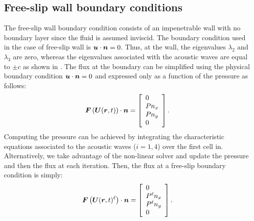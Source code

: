 \subsection{Free-slip wall boundary conditions} \label{sec:wall-bc}
The free-slip wall boundary condition consists of an impenetrable wall with no boundary layer since the fluid is assumed inviscid. The boundary condition used in the case of free-slip wall is $\boldsymbol u \cdot \boldsymbol n = 0$. Thus, at the wall, the eigenvalues $\lambda_2$ and $\lambda_3$ are zero, whereas the eigenvalues associated with the acoustic waves are equal to $\pm c$ as shown in . The flux at the boundary can be simplified using the physical boundary condition $\boldsymbol u \cdot \boldsymbol n = 0$ and expressed only as a function of the pressure as follows:
%
\begin{equation}\label{eq:flux-wall-bc}
\boldsymbol F \left( \boldsymbol U(\boldsymbol r, t) \right) \cdot \boldsymbol n = 
\left[ 
\begin{array}{l}
0\\
P n_x \\
P n_y \\
0
\end{array}
\right] .
\end{equation}
%
Computing the pressure can be achieved by integrating the characteristic equations associated to the acoustic waves ($i=1,4$) over the first cell in. Alternatively, we take advantage of the non-linear solver and update the pressure and then the flux at each iteration. Then, the flux at a free-slip boundary condition is simply:
%
\begin{equation}\label{eq:flux-wall-bc-k}
\boldsymbol F \left( \boldsymbol U(\boldsymbol r, t)^\ell \right) \cdot \boldsymbol n = 
\left[ 
\begin{array}{l}
0\\
P^\ell n_x \\
P^\ell n_y \\
0
\end{array}
\right] .
\end{equation}
%
